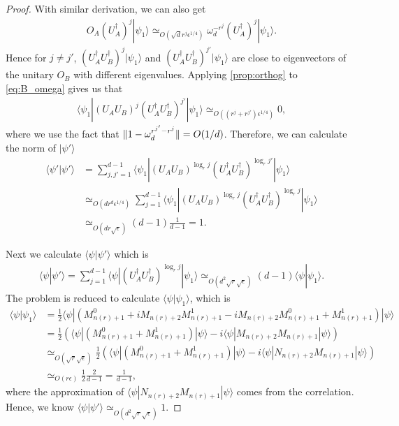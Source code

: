 \documentclass[11pt,letterpaper]{article}
\newcommand{\ket}[1]{|#1\rangle}
\newcommand{\bra}[1]{\langle#1|}
\newcommand{\braket}[2]{\langle#1|#2\rangle}
\newcommand{\ct}{^{\dagger}}
\DeclarePairedDelimiter{\norm}{\lVert}{\rVert}
\newcommand{\1}{\mathbb{1}}
\newcommand{\nr}{n(r)}
\newcommand{\ep}{\epsilon}
\newcommand{\se}{\sqrt{\epsilon}}
\newcommand{\qe}{\epsilon^{1/4}}
\newcommand{\sd}{\sqrt{d}}
\newcommand{\sr}{\sqrt{r}}
\newcommand{\appd}[1]{\simeq_{#1}}
\theoremstyle{definition}
\begin{document}
\begin{proof}
    With similar derivation, we can also get
    \begin{align}
    \label{eq:A_omega}
        O_A (U_A\ct)^j \ket{\psi_1} \appd{O(\sd r^{j} \qe)}\omega_d^{-r^j}  (U_A\ct)^j \ket{\psi_1}.
    \end{align}
	Hence for $j \neq j'$, $(U_A\ct U_B\ct)^{j} \ket{\psi_1}$ and $(U_A\ct U_B\ct)^{ j'} \ket{\psi_1}$ are close to eigenvectors
	of the unitary $O_B$ with different eigenvalues.
	Applying \cref{prop:orthog} to \cref{eq:B_omega} gives us that  
	\begin{align*}
		\bra{\psi_1} (U_AU_B)^{j} (U_A\ct U_B\ct)^{ j'} \ket{\psi_1} \appd{O( (r^j + r^{j'}) \qe)} 0,
	\end{align*}
	where we use the fact that $\norm{1 - \omega_d^{r^{j'}-r^j}} = O(1/d)$.
	Therefore, we can calculate the norm of $\ket{\psi'}$ 
	\begin{align*}
		\braket{\psi'}{\psi'} &=\sum_{j,j'=1}^{d-1} \bra{\psi_1} (U_AU_B)^{\log_r j} (U_A\ct U_B\ct)^{\log_r j'} \ket{\psi_1}\\
		&\appd{O(dr^{d} \qe)} \sum_{j=1}^{d-1} \bra{\psi_1} (U_AU_B)^{\log_r j} (U_A\ct U_B\ct)^{\log_r j} \ket{\psi_1}\\
		&\appd{O(dr\se)} (d-1) \frac{1}{d-1} = 1.
	\end{align*}
	
	Next we calculate $\braket{\psi}{\psi'}$ which is
	\begin{align*}
		\braket{\psi}{\psi'} = \sum_{j=1}^{d-1} \bra{\psi} (U_A\ct U_B\ct)^{\log_r j} \ket{\psi_1}
		 \appd{O(d^2\sr\se)} (d-1) \braket{\psi}{\psi_1}.
	\end{align*}
	The problem is reduced to calculate $\braket{\psi}{\psi_1}$, which is
	\begin{align*}
		\braket{\psi}{\psi_1} &= \frac{1}{2} \bra{\psi} (M_{\nr+1}^0 + iM_{\nr+2}M_{\nr+1}^1 - iM_{\nr+2}M_{\nr+1}^0 +M_{\nr+1}^1) \ket{\psi}\\
		& = \frac{1}{2} \left(\bra{\psi}(M_{\nr+1}^0 + M_{\nr+1}^1) \ket{\psi} - i \bra{\psi}M_{\nr+2}M_{\nr+1} \ket{\psi} \right)\\
		& \appd{O(\sr\se)} \frac{1}{2} \left(\bra{\psi}(M_{\nr+1}^0 + M_{\nr+1}^1) \ket{\psi}  - i \bra{\psi}N_{\nr+2}M_{\nr+1} \ket{\psi} \right)\\
		& \appd{O(r \ep)} \frac{1}{2} \frac{2}{d-1} = \frac{1}{d-1},
	\end{align*}
	where the approximation of $\bra{\psi}N_{\nr+2}M_{\nr+1} \ket{\psi}$ comes from the correlation.
	Hence, we know $\braket{\psi}{\psi'} \appd{O(d^2 \sr \se)} 1$.
	

\end{proof}
\end{document}
